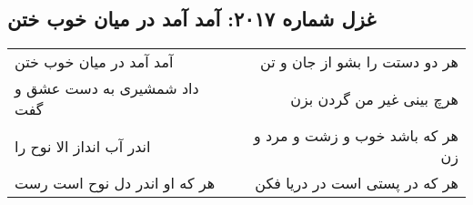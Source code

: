\begin{center}
\section*{غزل شماره ۲۰۱۷: آمد آمد در میان خوب ختن}
\label{sec:2017}
\begin{longtable}{l p{0.5cm} r}
آمد آمد در میان خوب ختن
&&
هر دو دستت را بشو از جان و تن
\\
داد شمشیری به دست عشق و گفت
&&
هرچ بینی غیر من گردن بزن
\\
اندر آب انداز الا نوح را
&&
هر که باشد خوب و زشت و مرد و زن
\\
هر که او اندر دل نوح است رست
&&
هر که در پستی است در دریا فکن
\\
\end{longtable}
\end{center}
